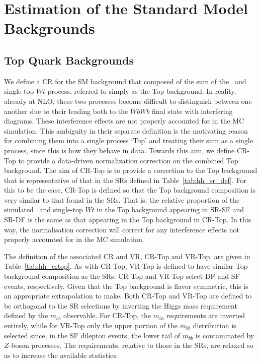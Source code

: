 \section{Estimation of the Standard Model Backgrounds}
\label{sec:hh_background_estimate}

%
%

\FloatBarrier
\subsection{Top Quark Backgrounds}
\label{sec:cr_top}

We define a CR for the SM background that composed of the sum of the \ttbar~and single-top $Wt$
process, referred to simply as the Top background.
In reality, already at NLO, these two processes become difficult to distinguish between one another
due to their leading both to the $WbWb$ final state with interfering diagrams.
These interference effects are not properly accounted for in the MC simulation.
This ambiguity in their separate definition is the motivating reason for combining them into a single
process `Top' and treating their sum as a single process, since this is how they behave in data.
Towards this aim, we define CR-Top to provide a data-driven normalization correction on the combined Top
background.
The aim of CR-Top is to provide a correction to the Top background that is representative of that in the SRs
defined in Table~\ref{tab:hh_sr_def}.
For this to be the case, CR-Top is defined so that the Top background composition is very similar to that
found in the SRs.
That is, the relative proportion of the simulated \ttbar~and single-top $Wt$ in the Top background appearing
in SR-SF and SR-DF is the same as that appearing in the Top background in CR-Top.
In this way, the normalisation correction will correct for any interference effects not properly accounted for
in the MC simulation.

The definition of the associated CR and VR, CR-Top and VR-Top, are given in Table~\ref{tab:hh_crtop}.
As with CR-Top, VR-Top is defined to have similar Top background composition as the SRs.
CR-Top and VR-Top select DF and SF events, respectively.
Given that the Top background is flavor symmetric, this is an appropriate extrapolation to make.
Both CR-Top and VR-Top are defined to be orthogonal to the SR selections by inverting the Higgs mass requirement
defined by the $m_{bb}$ observable.
For CR-Top, the $m_{bb}$ requirements are inverted entirely, while for VR-Top only the upper portion of the $m_{bb}$
distribution is selected since, in the SF dilepton events, the lower tail of $m_{bb}$ is contaminated by $Z$-boson
processes.
The \dhh requirements, relative to those in the SRs, are relaxed so as to increase the available statistics.

